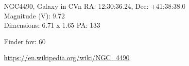 \begin{block}{NGC4490, Galaxy in CVn}
    RA: 12:30:36.24, Dec: +41:38:38.0 \\ 
    Magnitude (V): 9.72 \\ 
    Dimensions: 6.71 x 1.65 PA: 133 

    Finder fov: 60 

    \url{https://en.wikipedia.org/wiki/NGC_4490} 
\end{block}